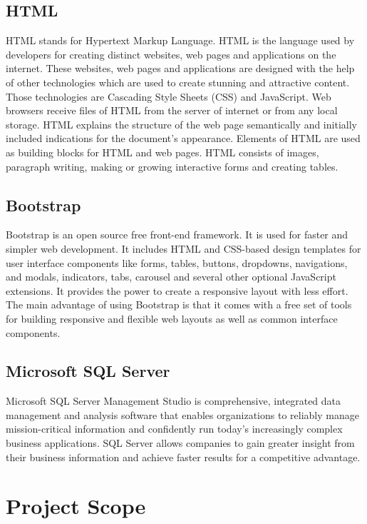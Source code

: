 \subsection{HTML}

HTML stands for Hypertext Markup Language. HTML is the language used by developers for creating distinct websites, web pages and applications on the internet. These websites, web pages and applications are designed with the help of other technologies which are used to create stunning and attractive content. Those technologies are Cascading Style Sheets (CSS) and JavaScript. Web browsers receive files of HTML from the server of internet or from any local storage. HTML explains the structure of the web page semantically and initially included indications for the document's appearance. Elements of HTML are used as building blocks for HTML and web pages. HTML consists of images, paragraph writing, making or growing interactive forms and creating tables.

\subsection{Bootstrap}

Bootstrap is an open source free front-end framework. It is used for faster and simpler web development. It includes HTML and CSS-based design templates for user interface components like forms, tables, buttons, dropdowns, navigations, and modals, indicators, tabs, carousel and several other optional JavaScript extensions. It provides the power to create a responsive layout with less effort. The main advantage of using Bootstrap is that it comes with a free set of tools for building responsive and flexible web layouts as well as common interface components.

\subsection{Microsoft SQL Server}

Microsoft SQL Server Management Studio is comprehensive, integrated data management and analysis software that enables organizations to reliably manage mission-critical information and confidently run today's increasingly complex business applications. SQL Server allows companies to gain greater insight from their business information and achieve faster results for a competitive advantage.

\section{Project Scope}

